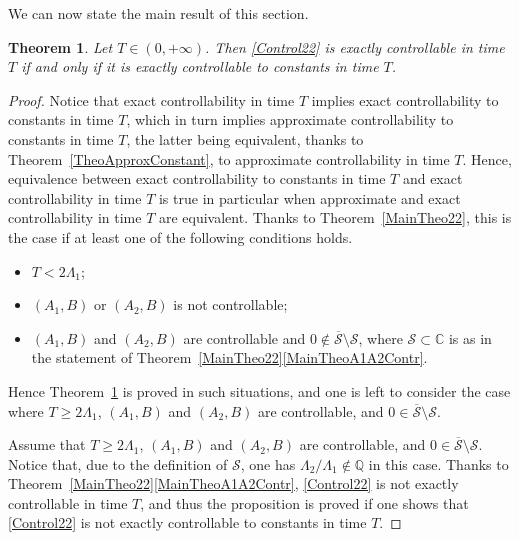\documentclass[10pt]{amsart}
\theoremstyle{plain}
\newtheorem{theo}{Theorem}[section]
\theoremstyle{definition}
\begin{document}
We can now state the main result of this section.


\begin{theo}
\label{TheoExactConstant}
Let $T \in (0, +\infty)$. Then \eqref{Control22} is exactly controllable in time $T$ if and only if it is exactly controllable to constants in time $T$.
\end{theo}


\begin{proof}
Notice that exact controllability in time $T$ implies exact controllability to constants in time $T$, which in turn implies approximate controllability to constants in time $T$, the latter being equivalent, thanks to Theorem~\ref{TheoApproxConstant}, to approximate controllability in time $T$. Hence, equivalence between exact controllability to constants in time $T$ and exact controllability in time $T$ is true in particular when approximate and exact controllability in time $T$ are equivalent. Thanks to Theorem~\ref{MainTheo22}, this is the case if at least one of the following conditions holds.
\begin{itemize}
\item $T < 2 \Lambda_1$;
\item $(A_1, B)$ or $(A_2, B)$ is not controllable;
\item $(A_1, B)$ and $(A_2, B)$ are controllable and $0 \notin \overline{\mathcal S} \setminus \mathcal S$, where $\mathcal S \subset \mathbb C$ is as in the statement of Theorem~\ref{MainTheo22}\eqref{MainTheoA1A2Contr}.
\end{itemize}
Hence Theorem~\ref{TheoExactConstant} is proved in such situations, and one is left to consider the case where $T \geq 2 \Lambda_1$, $(A_1, B)$ and $(A_2, B)$ are controllable, and $0 \in \overline{\mathcal S} \setminus \mathcal S$.

Assume that $T \geq 2 \Lambda_1$, $(A_1, B)$ and $(A_2, B)$ are controllable, and $0 \in \overline{\mathcal S} \setminus \mathcal S$. Notice that, due to the definition of $\mathcal S$, one has $\Lambda_2 / \Lambda_1 \notin \mathbb Q$ in this case. Thanks to Theorem~\ref{MainTheo22}\eqref{MainTheoA1A2Contr}, \eqref{Control22} is not exactly controllable in time $T$, and thus the proposition is proved if one shows that \eqref{Control22} is not exactly controllable to constants in time $T$.


\end{proof}
\end{document}
